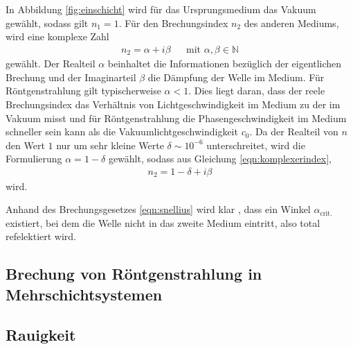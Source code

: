 In Abbildung \ref{fig:einschicht} wird für das Ursprungsmedium das Vakuum gewählt,
sodass gilt $n_{1} = 1$. Für den Brechungsindex $n_{2}$ des anderen Mediums,
wird eine komplexe Zahl
\begin{align}
  n_{2} = \alpha + i \beta& &\text{mit } \alpha, \beta \in \mathbb{N}
  \label{eqn:komplexerindex}
\end{align}
gewählt. Der Realteil $\alpha$ beinhaltet die Informationen bezüglich der eigentlichen
Brechung und der Imaginarteil $\beta$ die Dämpfung der Welle im Medium. Für Röntgenstrahlung
gilt typischerweise $\alpha < 1$. Dies liegt daran, dass der reele
Brechungsindex das Verhältnis von Lichtgeschwindigkeit im Medium zu der im Vakuum
misst und für Röntgenstrahlung die Phasengeschwindigkeit im Medium
schneller sein kann als die Vakuumlichtgeschwindigkeit $c_{0}$.
Da der Realteil von $n$ den Wert $1$ nur um sehr kleine Werte
$\delta \sim 10^{-6}$ unterschreitet, wird die Formulierung
$\alpha = 1 - \delta$ gewählt,
sodass aus Gleichung \eqref{eqn:komplexerindex},
\begin{align}
  n_{2} = 1 - \delta + i \beta
  \label{eqn:komplexerindexdelta}
\end{align}
wird.

Anhand des Brechungsgesetzes \eqref{eqn:snellius} wird klar , dass ein Winkel
$\alpha_\text{{crit.}}$ existiert, bei dem die Welle nicht in das
zweite Medium eintritt, also total refelektiert wird.





\subsection{Brechung von Röntgenstrahlung in Mehrschichtsystemen}
\label{subsec:mehrschicht}





\subsection{Rauigkeit}
\label{subsec:rauigkeit}





\cite{sample}
